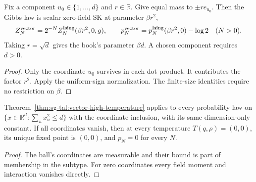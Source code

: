 \begin{theorem}\label{thm:sg-tal:vector-two-point}
\leanok
Fix a component $u_0\in\{1,\ldots,d\}$ and $r\in\mathbb R$. Give equal mass to
$\pm r e_{u_0}$. Then the Gibbs law is scalar zero-field SK at parameter $\beta r^2$,
\[
 Z_N^{\rm vector}=2^{-N}Z_N^{\rm Ising}(\beta r^2,0,g),\qquad
 p_N^{\rm vector}=p_N^{\rm Ising}(\beta r^2,0)-\log2\quad(N>0).
\]
Taking $r=\sqrt d$ gives the book's parameter $\beta d$. A chosen component requires $d>0$.
\end{theorem}
\begin{proof}
Only the coordinate $u_0$ survives in each dot product. It contributes the factor $r^2$.
Apply the uniform-sign normalization. The finite-size identities require no restriction on $\beta$.
\end{proof}

\begin{theorem}\label{thm:sg-tal:vector-ball-zero}
\leanok
Theorem~\ref{thm:sg-tal:vector-high-temperature} applies to every probability law on
$\{x\in\mathbb R^d:\sum_u x_u^2\le d\}$ with the coordinate inclusion, with its same
dimension-only constant. If all coordinates vanish, then at every temperature
$T(q,\rho)=(0,0)$, its unique fixed point is $(0,0)$, and $p_N=0$ for every $N$.
\end{theorem}
\begin{proof}
The ball's coordinates are measurable and their bound is part of membership in the
subtype. For zero coordinates every field moment and interaction vanishes directly.
\end{proof}

